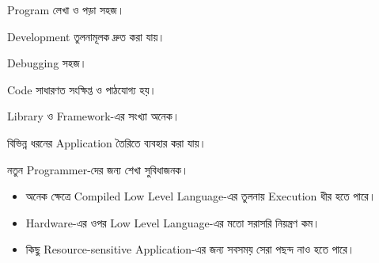 
\begin{compacttwocolpoints}

\item Program লেখা ও পড়া সহজ।

\item Development তুলনামূলক দ্রুত করা যায়।

\item Debugging সহজ।

\item Code সাধারণত সংক্ষিপ্ত ও পাঠযোগ্য হয়।

\item Library ও Framework-এর সংখ্যা অনেক।

\item বিভিন্ন ধরনের Application তৈরিতে ব্যবহার করা যায়।

\item নতুন Programmer-দের জন্য শেখা সুবিধাজনক।

\end{compacttwocolpoints}


\begin{itemize}

\item অনেক ক্ষেত্রে Compiled Low Level Language-এর তুলনায়
Execution ধীর হতে পারে।

\item Hardware-এর ওপর Low Level Language-এর মতো সরাসরি
নিয়ন্ত্রণ কম।

\item কিছু Resource-sensitive Application-এর জন্য সবসময়
সেরা পছন্দ নাও হতে পারে।

\end{itemize}


